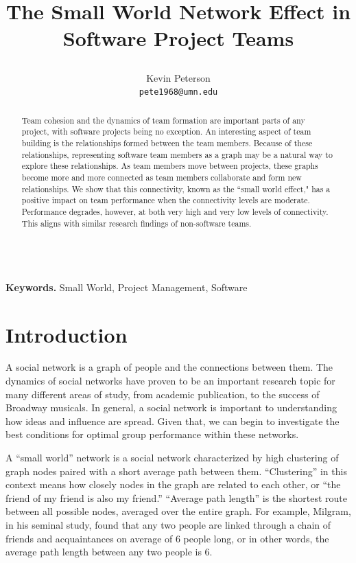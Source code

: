 \documentclass{proc}
\title{
The Small World Network Effect in Software Project Teams
\author{Kevin Peterson\\
\small \texttt{pete1968@umn.edu}
}
}
\begin{document}
\maketitle

\begin{abstract}
Team cohesion and the dynamics of team formation are important parts of any project, with software projects being no exception. An interesting aspect of team building is the relationships formed between the team members. Because of these relationships, representing software team members as a graph may be a natural way to explore these relationships. As team members move between projects, these graphs become more and more connected as team members collaborate and form new relationships. We show that this connectivity, known as the ``small world effect," has a positive impact on team performance when the connectivity levels are moderate. Performance degrades, however, at both very high and very low levels of connectivity. This aligns with similar research findings of non-software teams.
\end{abstract}

\noindent \\\textbf{Keywords.} Small World, Project Management, Software

\section{Introduction}
A social network is a graph of people and the connections between them. The dynamics of social networks have proven to be an important research topic for many different areas of study, from academic publication\cite{barabasi2002evolution}, to the success of Broadway musicals\cite{uzzi2005collaboration}. In general, a social network is important to understanding how ideas and influence are spread\cite{kempe2003maximizing}. Given that, we can begin to investigate the best conditions for optimal group performance within these networks.

A ``small world'' network is a social network characterized by high clustering of graph nodes paired with a short average path between them\cite{watts1998collective}. ``Clustering'' in this context means how closely nodes in the graph are related to each other, or ``the friend of my friend is also my friend.'' ``Average path length'' is the shortest route between all possible nodes, averaged over the entire graph. For example, Milgram, in his seminal study, found that any two people are linked through a chain of friends and acquaintances on average of 6 people long\cite{milgram1967small}, or in other words, the average path length between any two people is 6.
\end{document}
